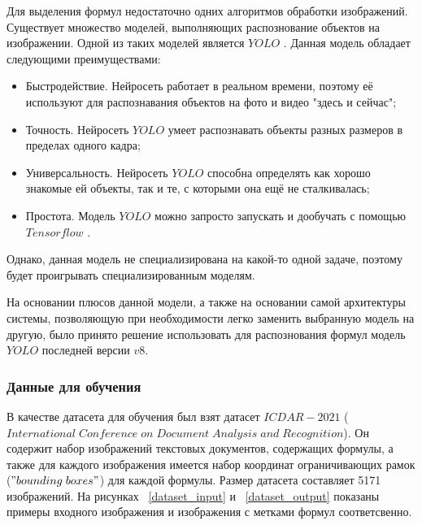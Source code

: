 Для выделения формул недостаточно одних алгоритмов обработки изображений. Существует множество моделей, выполняющих распознование объектов на изображении.
Одной из таких моделей является $YOLO$ \cite{yolo}. Данная модель обладает следующими преимуществами:
\begin{itemize}
    \item Быстродействие. Нейросеть работает в реальном времени, поэтому её используют для распознавания объектов на фото и видео "здесь и сейчас";
    \item Точность. Нейросеть $YOLO$ умеет распознавать объекты разных размеров в пределах одного кадра;
    \item Универсальность. Нейросеть $YOLO$ способна определять как хорошо знакомые ей объекты, так и те, с которыми она ещё не сталкивалась;
    \item Простота. Модель $YOLO$ можно запросто запускать и дообучать с помощью $Tensorflow$ \cite{tensorflow}.
\end{itemize}

Однако, данная модель не специализирована на какой-то одной задаче, поэтому будет проигрывать специализированным моделям.

На основании плюсов данной модели, а также на основании самой архитектуры системы, позволяющую при необходимости легко заменить выбранную модель на другую, было принято решение использовать для распознования формул модель $YOLO$ последней версии $v8$.

\subsubsection{Данные для обучения}

В качестве датасета для обучения был взят датасет $ICDAR-2021$ ($International\;Conference\;on\;Document\;Analysis\;and\;Recognition$). Он содержит набор изображений текстовых документов, содержащих формулы, 
а также для каждого изображения имеется набор координат ограничивающих рамок ($"bounding\; boxes"$) для каждой формулы.
Размер датасета составляет 5171 изображений.
На рисунках ~\ref{dataset_input} и ~\ref{dataset_output} показаны примеры входного изображения и изображения с метками формул соответсвенно.

